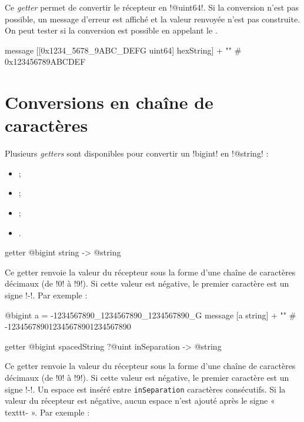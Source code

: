 Ce \emph{getter} permet de convertir le récepteur en \ggs!@uint64!. Si la conversion n'est pas possible, un message d'erreur est affiché et la valeur renvoyée n'est pas construite. On peut tester si la conversion est possible en appelant le .

\begin{galgas}
message [[0x1234_5678_9ABC_DEFG uint64] hexString] + "\n" # 0x123456789ABCDEF
\end{galgas}







\section{Conversions en chaîne de caractères}

Plusieurs \emph{getters} sont disponibles pour convertir un \ggs!bigint! en \ggs!@string! :
\begin{itemize}
  \item {} ;
  \item {} ;
  \item {} ;
  \item {}.
\end{itemize}


\begin{galgas}
getter @bigint string -> @string
\end{galgas}

Ce getter renvoie la valeur du récepteur sous la forme d'une chaîne de caractères décimaux (de \ggs!0! à \ggs!9!). Si cette valeur est négative, le premier caractère est un signe \ggs!-!. Par exemple :

\begin{galgas}
@bigint a = -1234567890_1234567890_1234567890_G
message [a string] + "\n" # -123456789012345678901234567890
\end{galgas}




\begin{galgas}
getter @bigint spacedString ?@uint inSeparation -> @string
\end{galgas}

Ce getter renvoie la valeur du récepteur sous la forme d'une chaîne de caractères décimaux (de \ggs!0! à \ggs!9!). Si cette valeur est négative, le premier caractère est un signe \ggs!-!. Un espace est inséré entre \texttt{inSeparation} caractères consécutifs. Si la valeur du récepteur est négative, aucun espace n'est ajouté après le signe « texttt{-} ». Par exemple :

